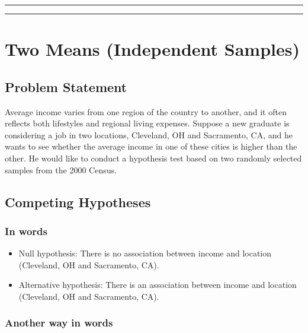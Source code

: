 \documentclass[]{tufte-book}
\let\oldrule=\rule
\renewcommand{\rule}[1]{\oldrule{\linewidth}}
\begin{document}
\begin{center}\rule{0.5\linewidth}{\linethickness}\end{center}

\begin{center}\rule{0.5\linewidth}{\linethickness}\end{center}

\section{Two Means (Independent
Samples)}\label{two-means-independent-samples}

\subsection{Problem Statement}\label{problem-statement-3}

Average income varies from one region of the country to another, and it
often reflects both lifestyles and regional living expenses. Suppose a
new graduate is considering a job in two locations, Cleveland, OH and
Sacramento, CA, and he wants to see whether the average income in one of
these cities is higher than the other. He would like to conduct a
hypothesis test based on two randomly selected samples from the 2000
Census. \citep[Tweaked a bit from][ {[}Chapter 5{]}]{isrs2014}

\subsection{Competing Hypotheses}\label{competing-hypotheses-3}

\subsubsection{In words}\label{in-words-3}

\begin{itemize}
\item
  Null hypothesis: There is no association between income and location
  (Cleveland, OH and Sacramento, CA).
\item
  Alternative hypothesis: There is an association between income and
  location (Cleveland, OH and Sacramento, CA).
\end{itemize}

\subsubsection{Another way in words}\label{another-way-in-words-1}
\end{document}
